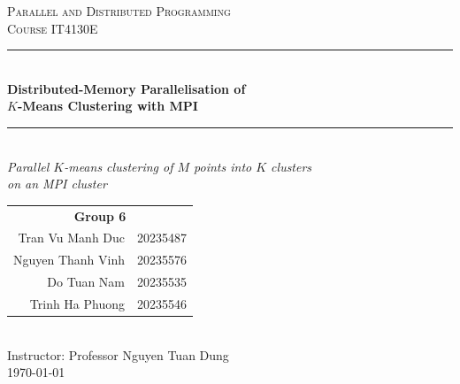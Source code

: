 \documentclass[11pt,a4paper]{article}
\newcommand{\groupid}{6}
\newcommand{\coursecode}{IT4130E}
\newcommand{\coursename}{Parallel and Distributed Programming}
\newcommand{\instructorname}{Professor Nguyen Tuan Dung}
\begin{document}
\begin{titlepage}
\centering
\vspace*{1.5cm}

{\large\scshape \coursename}\\[2pt]
{\large\scshape Course \coursecode}\\[1.2cm]

\rule{\linewidth}{0.4pt}\\[0.6cm]
{\LARGE\bfseries\color{accent} Distributed-Memory Parallelisation of\\[4pt]
$K$-Means Clustering with MPI\\[0.5cm]}
\rule{\linewidth}{0.4pt}\\[0.8cm]

{\large\itshape Parallel $K$-means clustering of $M$ points into $K$ clusters\\
on an MPI cluster}\\[1.6cm]

\begin{tabular}{rl}
\multicolumn{2}{c}{\large\bfseries Group \groupid}\\[10pt]
Tran Vu Manh Duc & 20235487\\[3pt]
Nguyen Thanh Vinh & 20235576\\[3pt]
Do Tuan Nam & 20235535\\[3pt]
Trinh Ha Phuong & 20235546\\
\end{tabular}\\[1.6cm]

{\large Instructor: \instructorname}\\[0.8cm]
{\large \today}

\vfill
\end{titlepage}

\thispagestyle{fancy}
\tableofcontents
\clearpage
\end{document}
